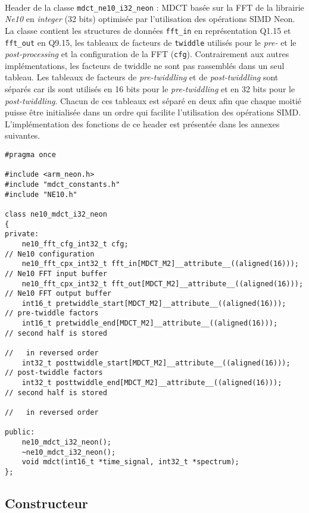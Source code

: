 \documentclass{article}
\begin{document}
\paragraph{}
Header de la classe \texttt{mdct\_ne10\_i32\_neon} : MDCT basée sur la FFT de la librairie \emph{Ne10} en \emph{integer} (32 bits) optimisée par l'utilisation des opérations SIMD Neon. La classe contient les structures de données \texttt{fft\_in} en représentation Q1.15 et \texttt{fft\_out} en Q9.15, les tableaux de facteurs de \texttt{twiddle} utilisés pour le \emph{pre-} et le \emph{post-processing} et la configuration de la FFT (\texttt{cfg}). Contrairement aux autres implémentations, les facteurs de twiddle ne sont pas rassemblés dans un seul tableau. Les tableaux de facteurs de \emph{pre-twiddling} et de \emph{post-twiddling} sont séparés car ils sont utilisés en 16 bits pour le \emph{pre-twiddling} et en 32 bits pour le \emph{post-twiddling}. Chacun de ces tableaux est séparé en deux afin que chaque moitié puisse être initialisée dans un ordre qui facilite l'utilisation des opérations SIMD. L'implémentation des fonctions de ce header est présentée dans les annexes suivantes.
\lstset{language=C++}
\begin{lstlisting}
#pragma once

#include <arm_neon.h>
#include "mdct_constants.h"
#include "NE10.h"

class ne10_mdct_i32_neon
{
private:
    ne10_fft_cfg_int32_t cfg;                                          // Ne10 configuration
    ne10_fft_cpx_int32_t fft_in[MDCT_M2]__attribute__((aligned(16)));  // Ne10 FFT input buffer
    ne10_fft_cpx_int32_t fft_out[MDCT_M2]__attribute__((aligned(16))); // Ne10 FFT output buffer
    int16_t pretwiddle_start[MDCT_M2]__attribute__((aligned(16)));     // pre-twiddle factors
    int16_t pretwiddle_end[MDCT_M2]__attribute__((aligned(16)));       // second half is stored
                                                                       //   in reversed order
    int32_t posttwiddle_start[MDCT_M2]__attribute__((aligned(16)));    // post-twiddle factors
    int32_t posttwiddle_end[MDCT_M2]__attribute__((aligned(16)));      // second half is stored
                                                                       //   in reversed order

public:
    ne10_mdct_i32_neon();
    ~ne10_mdct_i32_neon();
    void mdct(int16_t *time_signal, int32_t *spectrum);
};
\end{lstlisting}

\subsection{Constructeur}\label{app:mdct_ne10_i32_neon_constructor}
\end{document}
